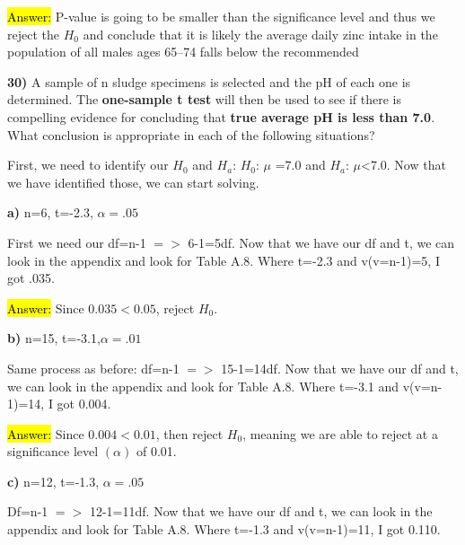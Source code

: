 \documentclass{article}
\begin{document}
\hl{Answer:} P-value is going to be smaller than the significance level and thus we reject the $H_{0}$ and conclude that it is likely the average daily zinc intake in the population of all males ages 65–74 falls below the recommended 



\newpage
\textbf{30)} A sample of n sludge specimens is selected and the pH of each one is determined. The \textbf{one-sample t test} will then be used to see if there is compelling evidence for concluding that \textbf{true average pH is less than 7.0}. What conclusion is appropriate in each of the following situations?

\vspace{3mm}

First, we need to identify our $H_{0}$ and $H_{a}$:   $H_{0}$: $\mu$ =7.0 and $H_{a}$: $\mu$<7.0. Now that we have identified those, we can start solving.

\vspace{3mm}

\textbf{a)} n=6, t=-2.3, $\alpha=.05$

\vspace{2mm}

First we need our df=n-1 $=>$ 6-1=5df. Now that we have our df and t, we can look in the appendix and look for Table A.8. Where t=-2.3 and v(v=n-1)=5, I got .035. 

\hl{Answer:} Since $0.035<0.05$, reject $H_{0}$. 

\vspace{3mm}

\textbf{b)} n=15, t=-3.1,$\alpha=.01$

\vspace{2mm}

Same process as before: df=n-1 $=>$ 15-1=14df. Now that we have our df and t, we can look in the appendix and look for Table A.8. Where t=-3.1 and v(v=n-1)=14, I got 0.004. 

\hl{Answer:} Since $0.004<0.01$, then reject $H_{0}$, meaning we are able to reject at a significance level $(\alpha)$ of 0.01. 

\vspace{2mm}

\textbf{c)} n=12, t=-1.3, $\alpha=.05$

\vspace{2mm}

Df=n-1 $=>$ 12-1=11df. Now that we have our df and t, we can look in the appendix and look for Table A.8. Where t=-1.3 and v(v=n-1)=11, I got 0.110. 
\end{document}
